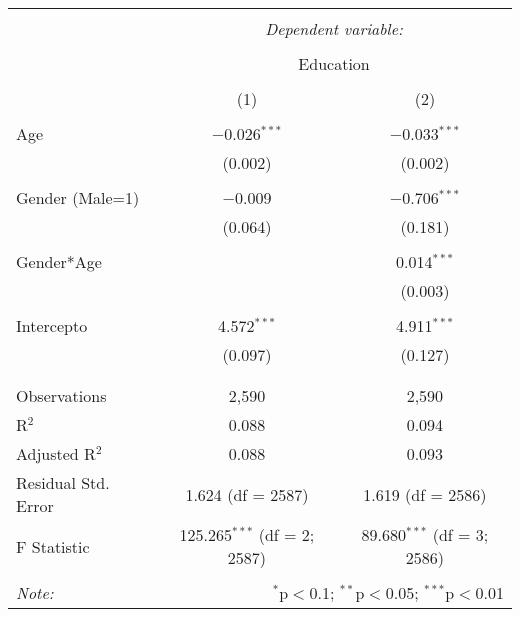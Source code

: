 
\begin{table}[!htbp] \centering 
  \caption{} 
  \label{} 
\begin{tabular}{@{\extracolsep{5pt}}lcc} 
\\[-1.8ex]\hline 
\hline \\[-1.8ex] 
 & \multicolumn{2}{c}{\textit{Dependent variable:}} \\ 
\cline{2-3} 
\\[-1.8ex] & \multicolumn{2}{c}{Education} \\ 
\\[-1.8ex] & (1) & (2)\\ 
\hline \\[-1.8ex] 
 Age & $-$0.026$^{***}$ & $-$0.033$^{***}$ \\ 
  & (0.002) & (0.002) \\ 
  & & \\ 
 Gender (Male=1) & $-$0.009 & $-$0.706$^{***}$ \\ 
  & (0.064) & (0.181) \\ 
  & & \\ 
 Gender*Age &  & 0.014$^{***}$ \\ 
  &  & (0.003) \\ 
  & & \\ 
 Intercepto & 4.572$^{***}$ & 4.911$^{***}$ \\ 
  & (0.097) & (0.127) \\ 
  & & \\ 
\hline \\[-1.8ex] 
Observations & 2,590 & 2,590 \\ 
R$^{2}$ & 0.088 & 0.094 \\ 
Adjusted R$^{2}$ & 0.088 & 0.093 \\ 
Residual Std. Error & 1.624 (df = 2587) & 1.619 (df = 2586) \\ 
F Statistic & 125.265$^{***}$ (df = 2; 2587) & 89.680$^{***}$ (df = 3; 2586) \\ 
\hline 
\hline \\[-1.8ex] 
\textit{Note:}  & \multicolumn{2}{r}{$^{*}$p$<$0.1; $^{**}$p$<$0.05; $^{***}$p$<$0.01} \\ 
\end{tabular} 
\end{table} 
